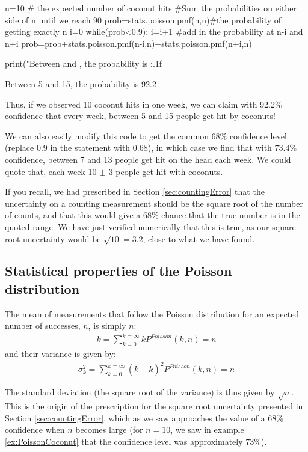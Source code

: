 \begin{example}
\begin{python}[caption = Computing a 90\% confidence interval]
n=10 # the expected number of coconut hits
#Sum the probabilities on either side of n until we reach 90%
prob=stats.poisson.pmf(n,n)#the probability of getting exactly n
i=0
while(prob<0.9):
    i=i+1
    #add in the probability at n-i and n+i
    prob=prob+stats.poisson.pmf(n-i,n)+stats.poisson.pmf(n+i,n)
    
print("Between {} and {}, the probability is {:.1f}%
\end{python}
\begin{poutput}
Between 5 and 15, the probability is 92.2%
\end{poutput}
Thus, if we observed 10 coconut hits in one week, we can claim with 92.2\% confidence that every week, between 5 and 15 people get hit by coconuts! 

We can also easily modify this code to get the common 68\% confidence level (replace 0.9 in the  statement with 0.68), in which case we find that with 73.4\% confidence, between 7 and 13 people get hit on the head each week. We could quote that, each week 10 $\pm$ 3 people get hit with coconuts.

If you recall, we had prescribed in Section \ref{sec:countingError} that the uncertainty on a counting measurement should be the square root of the number of counts, and that this would give a 68\% chance that the true number is in the quoted range. We have just verified numerically that this is true, as our square root uncertainty would be $\sqrt{10}=3.2$, close to what we have found. 
\end{example}   

\subsection{Statistical properties of the Poisson distribution}
The mean of measurements that follow the Poisson distribution for an expected number of successes, $n$, is simply $n$:
\begin{align}
\bar k = \sum_{k=0}^{k=\infty}kP^{Poisson}(k,n)=n
\end{align}
and their variance is given by:
\begin{align}
\sigma_k^2 = \sum_{k=0}^{k=\infty}(k-\bar k)^2P^{Poisson}(k,n)=n
\end{align}

The standard deviation (the square root of the variance) is thus given by $\sqrt{n}$. This is the origin of the prescription for the square root uncertainty presented in Section \ref{sec:countingError}, which as we saw approaches the value of a 68\% confidence when $n$ becomes large (for $n=10$, we saw in example \ref{ex:PoissonCoconut} that the confidence level was approximately 73\%).

